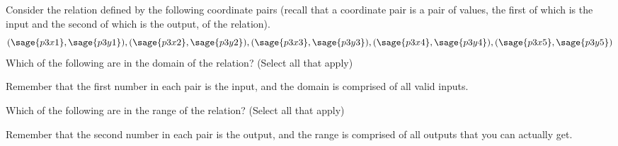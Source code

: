 \documentclass{ximera}
\begin{document}
\begin{problem}
    Consider the relation defined by the following coordinate pairs (recall that a coordinate pair is a pair of values, the first of which is the input and the second of which is the output, of the relation).
    \[
        (\sage{p3x1},\sage{p3y1}),(\sage{p3x2},\sage{p3y2}),(\sage{p3x3},\sage{p3y3}),(\sage{p3x4},\sage{p3y4}),(\sage{p3x5},\sage{p3y5})
    \]
    Which of the following are in the domain of the relation? (Select all that apply)
    \begin{selectAll}
    \end{selectAll}
    \begin{feedback}
        Remember that the first number in each pair is the input, and the domain is comprised of all valid inputs.
    \end{feedback}
    
    \begin{problem}
        Which of the following are in the range of the relation? (Select all that apply)
        \begin{selectAll}
        \end{selectAll}
        \begin{feedback}
            Remember that the second number in each pair is the output, and the range is comprised of all outputs that you can actually get.
        \end{feedback}
    \end{problem}
\end{problem}
\end{document}

